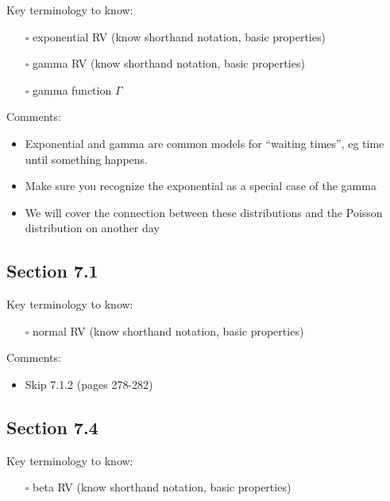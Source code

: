 \documentclass[
  letterpaper,
]{scrbook}
\providecommand{\tightlist}{%
  \setlength{\itemsep}{0pt}\setlength{\parskip}{0pt}}\usepackage{longtable,booktabs,array}
\begin{document}
Key terminology to know:

\begin{itemize}
\tightlist
\item[$\square$]
  exponential RV (know shorthand notation, basic properties)
\item[$\square$]
  gamma RV (know shorthand notation, basic properties)
\item[$\square$]
  gamma function \(\Gamma\)
\end{itemize}

Comments:

\begin{itemize}
\tightlist
\item
  Exponential and gamma are common models for ``waiting times'', eg time
  until something happens.
\item
  Make sure you recognize the exponential as a special case of the gamma
\item
  We will cover the connection between these distributions and the
  Poisson distribution on another day
\end{itemize}

\subsection*{Section 7.1}\label{section-7.1}

Key terminology to know:

\begin{itemize}
\tightlist
\item[$\square$]
  normal RV (know shorthand notation, basic properties)
\end{itemize}

Comments:

\begin{itemize}
\tightlist
\item
  Skip 7.1.2 (pages 278-282)
\end{itemize}

\subsection*{Section 7.4}\label{section-7.4}

Key terminology to know:

\begin{itemize}
\tightlist
\item[$\square$]
  beta RV (know shorthand notation, basic properties)
\end{itemize}
\end{document}
